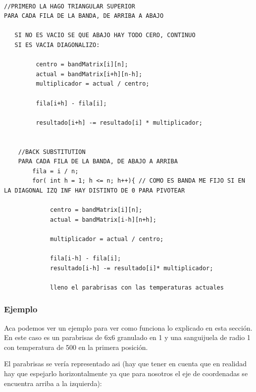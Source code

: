 \begin{verbatim}

//PRIMERO LA HAGO TRIANGULAR SUPERIOR
PARA CADA FILA DE LA BANDA, DE ARRIBA A ABAJO
		
   SI NO ES VACIO SE QUE ABAJO HAY TODO CERO, CONTINUO
   SI ES VACIA DIAGONALIZO:
        
         centro = bandMatrix[i][n];
         actual = bandMatrix[i+h][n-h];
         multiplicador = actual / centro;
		
         fila[i+h] - fila[i];

         resultado[i+h] -= resultado[i] * multiplicador;
   

    //BACK SUBSTITUTION
    PARA CADA FILA DE LA BANDA, DE ABAJO A ARRIBA
        fila = i / n;
        for( int h = 1; h <= n; h++){ // COMO ES BANDA ME FIJO SI EN LA DIAGONAL IZQ INF HAY DISTINTO DE 0 PARA PIVOTEAR
           
             centro = bandMatrix[i][n];
             actual = bandMatrix[i-h][n+h];
           
             multiplicador = actual / centro;
		
             fila[i-h] - fila[i];
             resultado[i-h] -= resultado[i]* multiplicador;
                
             lleno el parabrisas con las temperaturas actuales
\end{verbatim}


\subsubsection{Ejemplo}

Aca podemos ver un ejemplo para ver como funciona lo explicado en esta sección.
En este caso es un parabrisas de 6x6 granulado en 1 y una sanguijuela de radio 1 con temperatura de 500 en la primera posición.

El parabrisas se vería representado asi (hay que tener en cuenta que en realidad hay que espejarlo horizontalmente ya que para nosotros el eje de coordenadas se encuentra arriba a la izquierda):

